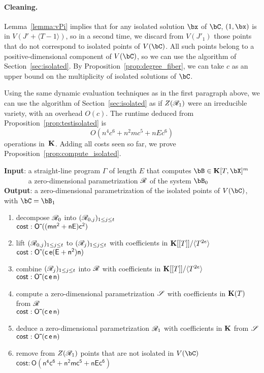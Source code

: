 \documentclass[12pt]{article}
\begin{document}
\paragraph{Cleaning.}
Lemma~\ref{lemma:vPi} implies that for any isolated solution $\bx$ of
$\bC$, $(1,\bx)$ is in $V(J' + \langle T-1\rangle)$, so in a second
time, we discard from $V(J'_1)$ those points that do not correspond to
isolated points of $V(\bC)$. All such points belong to a
positive-dimensional component of $V(\bC)$, so we can use the algorithm
of Section~\ref{sec:isolated}. By Proposition~\ref{prop:degree_fiber},
we can take $c$ as an upper bound on the multiplicity of isolated
solutions of $\bC$.

Using the same dynamic evaluation techniques as in the first paragraph
above, we can use the algorithm of Section~\ref{sec:isolated} as if
$Z(\mathscr{R}_1)$ were an irreducible variety, with an overhead 
$O(c)$. The runtime deduced from Proposition~\ref{prop:testisolated} is
$$O(n^4 c^6 + n^2 m c^5 + n E c^6)$$ operations in~$\mathbf{K}$. Adding all
costs seen so far, we prove Proposition~\ref{prop:compute_isolated}.
\begin{algorithm}
\caption{$\mathsf{Homotopy}(\Gamma,\scrR)$}
{\bf Input}: a straight-line program $\Gamma$ of length $E$ that computes $\bB \in \KK[T,\bX]^m$\\
\textcolor{white}{{\bf Input}:} a zero-dimensional parametrization $\mathscr{R}$ of the system $\bB_0$\\
{\bf Output}: a zero-dimensional parametrization of the isolated points of $V(\bC)$, with $\bC=\bB_1$
\begin{enumerate}
  \setlength\itemsep{0em}
\item decompose $\mathscr{R}_0$ into $(\mathscr{R}_{0,j})_{1 \leq j \leq t}$\\
$\mathsf{cost: {O}{\,\tilde{ }\,}((mn^2 + nE) c^2)}$
\item lift $(\mathscr{R}_{0,j})_{1 \leq j \leq t}$ to $(\mathscr{R}_j)_{1\leq j \leq t}$ with 
  coefficients in $\mathbf{K}[[T]]/\langle T^{2e}\rangle$\\
$\mathsf{cost: {O}{\,\tilde{ }\,}(c\,e (E+n^2)n)}$
\item combine $(\mathscr{R}_j)_{1 \leq j \leq t}$ into  $\mathscr{R}$ with coefficients in $\mathbf{K}[[T]]/\langle T^{2e}\rangle$\\
$\mathsf{cost: {O}{\,\tilde{ }\,}(c\,e\,n)}$
\item compute a zero-dimensional parametrization $\mathscr{S}$ with coefficients in $\mathbf{K}(T)$ from $\mathscr{R}$\\
$\mathsf{cost: {O}{\,\tilde{ }\,}(c\,e\,n)}$
\item deduce a zero-dimensional parametrization $\mathscr{R}_1$ with coefficients in $\mathbf{K}$ from $\mathscr{S}$\\
$\mathsf{cost: {O}{\,\tilde{ }\,}(c\,e\,n)}$
\item remove from $Z(\mathscr{R}_1)$ points that are not isolated in $V(\bC)$ \\
$\mathsf{cost: O(n^4 c^6 + n^2 m c^5 + n E c^6)}$
\end{enumerate}
\label{DetSys}
\end{algorithm}
 
\end{document}

